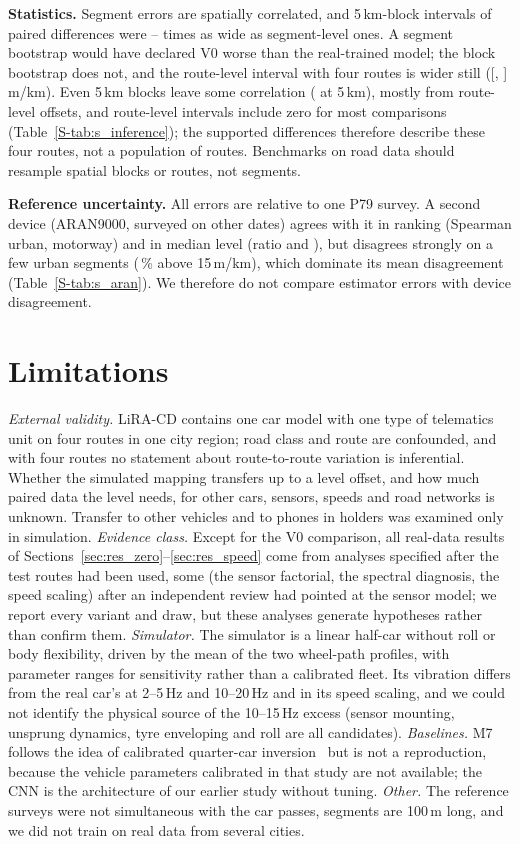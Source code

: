 \textbf{Statistics.}
Segment errors are spatially correlated, and 5\,km-block intervals of paired differences were \infWidthRatioMin--\infWidthRatioMax{} times as wide as segment-level ones.
A segment bootstrap would have declared V0 worse than the real-trained model; the block bootstrap does not, and the route-level interval with four routes is wider still ([\vrSimVzeroDrouteLo, \vrSimVzeroDrouteHi]\,m/km).
Even 5\,km blocks leave some correlation (\acfGbmFiveKm{} at 5\,km), mostly from route-level offsets, and route-level intervals include zero for most comparisons (Table~\ref{S-tab:s_inference}); the supported differences therefore describe these four routes, not a population of routes.
Benchmarks on road data should resample spatial blocks or routes, not segments.

\textbf{Reference uncertainty.}
All errors are relative to one P79 survey.
A second device (ARAN9000, surveyed on other dates) agrees with it in ranking (Spearman \arUrbanRho{} urban, \arMotorwayRho{} motorway) and in median level (ratio \arUrbanMedRatio{} and \arMotorwayMedRatio), but disagrees strongly on a few urban segments (\arUrbanShareFifteen\,\% above 15\,m/km), which dominate its mean disagreement (Table~\ref{S-tab:s_aran}).
We therefore do not compare estimator errors with device disagreement.

\section{Limitations}
\label{sec:limitations}
\emph{External validity.}
LiRA-CD contains one car model with one type of telematics unit on four routes in one city region; road class and route are confounded, and with four routes no statement about route-to-route variation is inferential.
Whether the simulated mapping transfers up to a level offset, and how much paired data the level needs, for other cars, sensors, speeds and road networks is unknown.
Transfer to other vehicles and to phones in holders was examined only in simulation.
\emph{Evidence class.}
Except for the V0 comparison, all real-data results of Sections~\ref{sec:res_zero}--\ref{sec:res_speed} come from analyses specified after the test routes had been used, some (the sensor factorial, the spectral diagnosis, the speed scaling) after an independent review had pointed at the sensor model; we report every variant and draw, but these analyses generate hypotheses rather than confirm them.
\emph{Simulator.}
The simulator is a linear half-car without roll or body flexibility, driven by the mean of the two wheel-path profiles, with parameter ranges for sensitivity rather than a calibrated fleet.
Its vibration differs from the real car's at 2--5\,Hz and 10--20\,Hz and in its speed scaling, and we could not identify the physical source of the 10--15\,Hz excess (sensor mounting, unsprung dynamics, tyre enveloping and roll are all candidates).
\emph{Baselines.}
M7 follows the idea of calibrated quarter-car inversion~\cite{skar2024inversion} but is not a reproduction, because the vehicle parameters calibrated in that study are not available; the CNN is the architecture of our earlier study without tuning.
\emph{Other.}
The reference surveys were not simultaneous with the car passes, segments are 100\,m long, and we did not train on real data from several cities.
